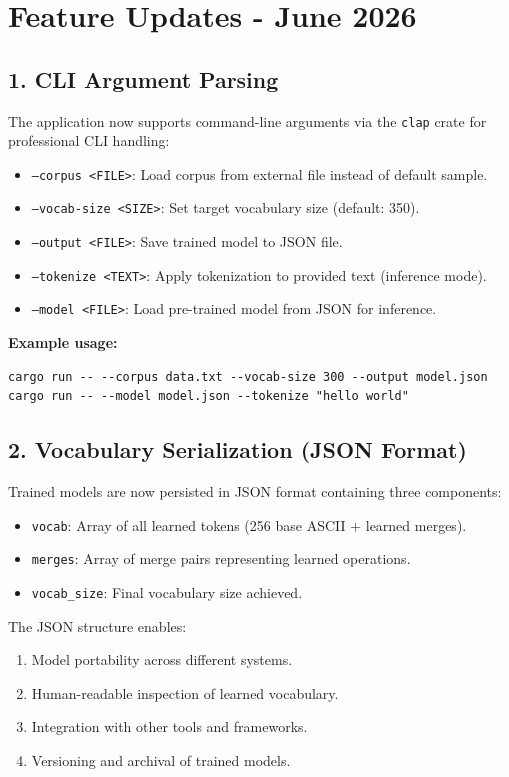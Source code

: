 \documentclass[11pt]{article}
\begin{document}
\newpage
\section{Feature Updates - June 2026}

\subsection{1. CLI Argument Parsing}
The application now supports command-line arguments via the \texttt{clap} crate for professional CLI handling:
\begin{itemize}[leftmargin=1.2em]
  \item \texttt{--corpus <FILE>}: Load corpus from external file instead of default sample.
  \item \texttt{--vocab-size <SIZE>}: Set target vocabulary size (default: 350).
  \item \texttt{--output <FILE>}: Save trained model to JSON file.
  \item \texttt{--tokenize <TEXT>}: Apply tokenization to provided text (inference mode).
  \item \texttt{--model <FILE>}: Load pre-trained model from JSON for inference.
\end{itemize}

\textbf{Example usage:}
\begin{verbatim}
cargo run -- --corpus data.txt --vocab-size 300 --output model.json
cargo run -- --model model.json --tokenize "hello world"
\end{verbatim}

\subsection{2. Vocabulary Serialization (JSON Format)}
Trained models are now persisted in JSON format containing three components:
\begin{itemize}[leftmargin=1.2em]
  \item \texttt{vocab}: Array of all learned tokens (256 base ASCII + learned merges).
  \item \texttt{merges}: Array of merge pairs representing learned operations.
  \item \texttt{vocab\_size}: Final vocabulary size achieved.
\end{itemize}

The JSON structure enables:
\begin{enumerate}[leftmargin=1.5em]
  \item Model portability across different systems.
  \item Human-readable inspection of learned vocabulary.
  \item Integration with other tools and frameworks.
  \item Versioning and archival of trained models.
\end{enumerate}
\end{document}
